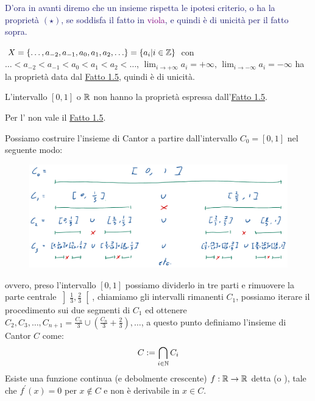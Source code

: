 \textcolor{MidnightBlue}{D'ora in avanti diremo che un insieme rispetta le ipotesi criterio, o ha la proprietà $(\star)$, se soddisfa il fatto in \textcolor{purple}{viola}, e quindi è di unicità per il fatto sopra.}

\begin{example}
	$X = \{\ldots,a_{-2},a_{-1},a_0,a_1,a_2,\ldots\} = \{a_i | i \in \mathbb Z\}$ con $\ldots < a_{-2} < a_{-1} < a_0 < a_1 < a_2 <\ldots$, $\lim_{i \to +\infty} a_i = +\infty$, $\lim_{i \to -\infty} a_i = -\infty$ ha la 
	proprietà data dal \hyperref[unicità]{Fatto 1.5}, quindi è di unicità.
\end{example}

\begin{notexample}
L'intervallo $[0,1]$ o $\mathbb R$ non hanno la proprietà espressa dall'\hyperref[unicità]{Fatto 1.5}.
\end{notexample}

\begin{notexampleb}
Per l' non vale il \hyperref[unicità]{Fatto 1.5}.
\end{notexampleb}

Possiamo costruire l'insieme di Cantor a partire dall'intervallo $C_0 = [0,1]$ nel seguente modo:

\begin{figure}[H]
	\centering
	\includegraphics[width=12.5cm]{immagini/cantor.png}
\end{figure}

ovvero, preso l'intervallo $[0,1]$ possiamo dividerlo in tre parti e rimuovere la parte centrale $\left]\frac 13, \frac 23\right[$, chiamiamo gli intervalli rimanenti $C_1$, possiamo iterare il procedimento sui due segmenti di $C_1$ ed ottenere $C_2,C_3,\ldots, C_{n+1} = \frac{C_n}{3} \cup \left(\frac{C_n}{3} + \frac{2}{3}\right),\ldots$, a questo punto 
definiamo l'insieme di Cantor $C$ come:
\[ C := \bigcap_{i \in \mathbb N}C_i
	\]
Esiste una funzione continua (e debolmente crescente) $f : \mathbb R \to \mathbb R$ detta  (o ), tale che $f^{\prime}(x) = 0$ per $x \not\in C$ e non è 
derivabile in $x \in C$.

